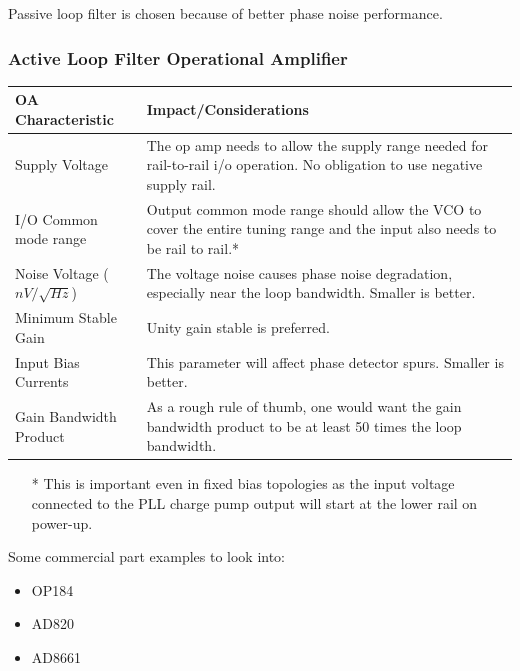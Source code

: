 \documentclass{article}
\begin{document}
Passive loop filter is chosen because of better phase noise performance.




\subsubsection*{Active Loop Filter Operational Amplifier}

\begin{table}[!ht]
    \centering
    \begin{tabular}{|l|p{100mm}|}
    \hline
        OA Characteristic & Impact/Considerations \\ \hline
        Supply Voltage & The op amp needs to allow the supply range needed for rail-to-rail i/o operation. No obligation to use negative supply rail. \\ \hline
        I/O Common mode range & Output common mode range should allow the VCO to cover the entire tuning range and the input also needs to be rail to rail.* \\ \hline
        Noise Voltage ($nV/\sqrt{Hz}$) & The voltage noise causes phase noise degradation, especially near the loop bandwidth. Smaller is better. \\ \hline
        Minimum Stable Gain & Unity gain stable is preferred. \\ \hline
        Input Bias Currents & This parameter will affect phase detector spurs. Smaller is better. \\ \hline
        Gain Bandwidth Product & As a rough rule of thumb, one would want the gain bandwidth product to be at least 50 times the loop bandwidth. 
		\\ \hline
    \end{tabular}
\end{table}

\begin{itemize}
	\item [*] This is important even in fixed bias topologies as the input voltage connected to the PLL charge pump output will start at the lower rail on power-up.
\end{itemize}

Some commercial part examples to look into:
\begin{itemize}
	\item OP184
	\item AD820
	\item AD8661 
\end{itemize}


\end{document}
